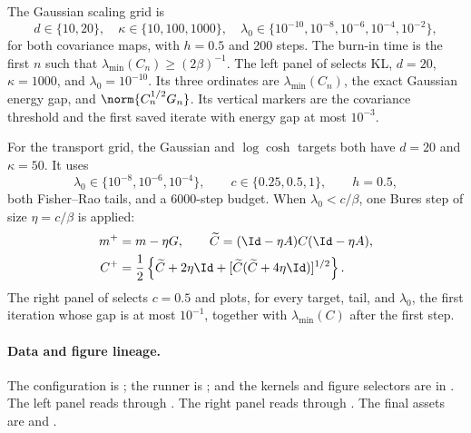 The Gaussian scaling grid is
\[
  d\in\{10,20\},\quad
  \kappa\in\{10,100,1000\},\quad
  \lambda_0\in\{10^{-10},10^{-8},10^{-6},10^{-4},10^{-2}\},
\]
for both covariance maps, with \(h=0.5\) and 200 steps.  The burn-in time is
the first \(n\) such that \(\lambda_{\min}(C_n)\geq(2\beta)^{-1}\).
The left panel of  selects KL, \(d=20\),
\(\kappa=1000\), and \(\lambda_0=10^{-10}\).  Its three ordinates are
\(\lambda_{\min}(C_n)\), the exact Gaussian energy gap, and
\(\norm{C_n^{1/2}G_n}\).  Its vertical markers are the covariance threshold
and the first saved iterate with energy gap at most \(10^{-3}\).

For the transport grid, the Gaussian and \(\log\cosh\) targets both have
\(d=20\) and \(\kappa=50\).  It uses
\[
  \lambda_0\in\{10^{-8},10^{-6},10^{-4}\},\qquad
  c\in\{0.25,0.5,1\},\qquad h=0.5,
\]
both Fisher--Rao tails, and a 6000-step budget.  When \(\lambda_0<c/\beta\),
one Bures step of size \(\eta=c/\beta\) is applied:
\begin{align*}
  m^+&=m-\eta G,\qquad
  \widetilde C=(\Id-\eta A)C(\Id-\eta A),\\
  C^+&=\frac12\left\{
    \widetilde C+2\eta\Id+
    [\widetilde C(\widetilde C+4\eta\Id)]^{1/2}
  \right\}.
\end{align*}
The right panel of  selects \(c=0.5\) and plots,
for every target, tail, and \(\lambda_0\), the first iteration whose gap is at
most \(10^{-1}\), together with \(\lambda_{\min}(C)\) after the first step.

\paragraph{Data and figure lineage.}
\begingroup\small\raggedright
The configuration is
;
the runner is
; and
the kernels and figure selectors are in
.  The left panel reads
 through
.  The right panel reads
through .  The final assets are
 and
.
\par\endgroup

